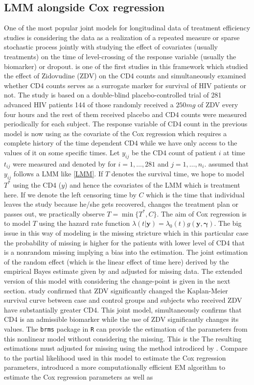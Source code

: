 \documentclass[]{article}
\begin{document}
		\subsection{LMM alongside Cox regression}
		One of the most popular joint models for longitudinal data of treatment efficiency studies is considering the data as a realization of a repeated measure or sparse stochastic process jointly with studying the effect of covariates (usually treatments) on the time of level-crossing of the response variable (usually the biomarker) or dropout. \cite{Tsiatis1995} is one of the first studies in this framework which studied the effect of Zidovudine (ZDV) on the CD4 counts and simultaneously examined whether CD4 counts serves as a surrogate marker for survival of HIV patients or not. The study is based on a double-blind placebo-controlled trial of 281 advanced HIV patients 144 of those randomly received a $250mg$ of ZDV every four hours and the rest of them received placebo and CD4 counts were measured periodically for each subject. The response variable of CD4 count in the previous model is now using as the covariate of the Cox regression which requires a complete history of the time dependent CD4 while we have only access to the values of it on some specific times. Let $y_{ij}$ be the CD4 count of patient $i$ at time $t_{ij}$ were measured and denoted by  for $i=1,\ldots,281$ and $j=1,\ldots,n_i$. \cite{Tsiatis1995} assumed that $y_{ij}$ follows a LMM like \eqref{LMM}. If $T$ denotes the survival time, we hope to model $T^*$ using the CD4 ($y$) and hence the covariates of the LMM which is treatment here. If we denote the left censoring time by $C$ which is the time that individual leaves the study because he/she gets recovered, changes the treatment plan or passes out, we practically observe $T=\min\{T^*,C\}$. The aim of Cox regression is to model $T$ using the hazard rate function $\lambda(t|\mathbf{y})=\lambda_0(t)g(\mathbf{y},\boldsymbol{\gamma})$. The big issue in this way of modeling is the missing stricture which in this particular case the probability of missing is higher for the patients with lower level of CD4 that is a nonrandom missing implying a bias into the estimation. The joint estimation of the random effect (which is the linear effect of time here) derived by the empirical Bayes estimate given by \cite{LairdWare} and adjusted for missing data. The extended version of this model with considering the change-point is given in the next section. \cite{Tsiatis1995} study confirmed that ZDV significantly changed the Kaplan-Meier survival curve between case and control groups and subjects who received ZDV have substantially greater CD4. This joint model, simultaneously confirms that CD4 is an admissible biomarker while the use of ZDV significantly changes its values. The \texttt{brms} package in \texttt{R} can provide the estimation of the parameters from this nonlinear model without considering the missing. This is the  The resulting estimations must adjusted for missing using the method introdiced by \cite{Tsiatis1995}. Compare to the partial likelihood used in this model to estimate the Cox regression parameters, \cite{WulfsohnTsiatis1997} introduced a more computationally efficient EM algorithm to estimate the Cox regression parameters as well as 
\end{document}
